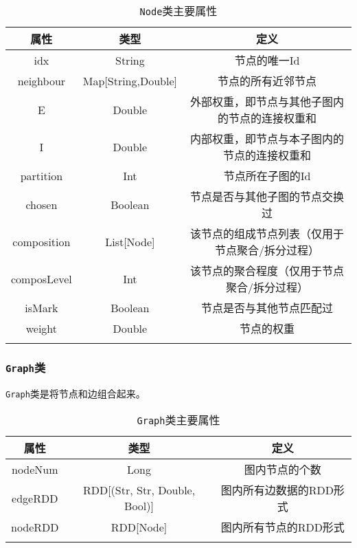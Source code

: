 \begin{table}[htbp]
    \centering
    \caption{\texttt{Node}类主要属性}
    \begin{tabular}{ccc}
        \hline
        属性& 类型 & 定义\\
        \hline
        idx         & String             & 节点的唯一Id \\
        neighbour   & Map[String,Double] & 节点的所有近邻节点\\
        E           & Double             & 外部权重，即节点与其他子图内的节点的连接权重和\\
        I           & Double             & 内部权重，即节点与本子图内的节点的连接权重和\\
        partition   & Int                & 节点所在子图的Id\\
        chosen      & Boolean            & 节点是否与其他子图的节点交换过\\
        composition & List[Node]         & 该节点的组成节点列表（仅用于节点聚合/拆分过程）\\
        composLevel & Int                & 该节点的聚合程度（仅用于节点聚合/拆分过程）\\
        isMark      & Boolean            & 节点是否与其他节点匹配过 \\
        weight      & Double             & 节点的权重\\
        \hline
        \centering
    \end{tabular}
\end{table}

\subsubsection{\texttt{Graph}类}

\texttt{Graph}类是将节点和边组合起来。

\begin{table}[htbp]
    \centering
    \caption{\texttt{Graph}类主要属性}
    \begin{tabular}{ccc}
        \hline
        属性& 类型 & 定义\\
        \hline
        nodeNum & Long & 图内节点的个数 \\
        edgeRDD & RDD[(Str, Str, Double, Bool)] & 图内所有边数据的RDD形式\\
        nodeRDD & RDD[Node] & 图内所有节点的RDD形式\\
        \hline
        \centering
    \end{tabular}
\end{table}

